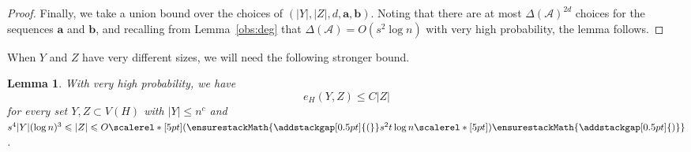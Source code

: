 \documentclass[12pt,reqno]{amsart}
\newcommand\pig[1]{\scalerel*[5pt]{\normalsize#1}{%
  \ensurestackMath{\addstackgap[0.5pt]{\normalsize#1}}}}
\newtheorem{lemma}[theorem]{Lemma}
\theoremstyle{remark}
\numberwithin{theorem}{section}
\renewcommand{\(}{\bigl(}
\renewcommand{\)}{\bigr)\vphantom{)}}
\newcommand{\cA}{\mathcal A}
\renewcommand{\le}{\leqslant}
\def\va{\mathbf{a}}
\def\vb{\mathbf{b}}
\begin{document}
\begin{proof}
Finally, we take a union bound over the choices of $(|Y|,|Z|,d,\va,\vb)$. Noting that there are at most $\Delta(\cA)^{2d}$ choices for the sequences $\va$ and $\vb$, and recalling from Lemma~\ref{obs:deg} that $\Delta(\cA) = O( s^2 \log n)$ with very high probability,  the lemma follows.
\end{proof}

When $Y$ and $Z$ have very different sizes, we will need the following stronger bound. 

\begin{lemma}\label{lem:intersection:asym}
With very high probability, we have
\begin{equation}\label{eq:intersection:asym}
e_H(Y,Z) \le C |Z|
\end{equation}
for every set $Y,Z \subset V(H)$ with $|Y| \le n^c$ and $s^4 |Y| (\log n)^3 \le |Z| \le O\pig( s^2 t \log n \pig)$. 
\end{lemma}
\end{document}
